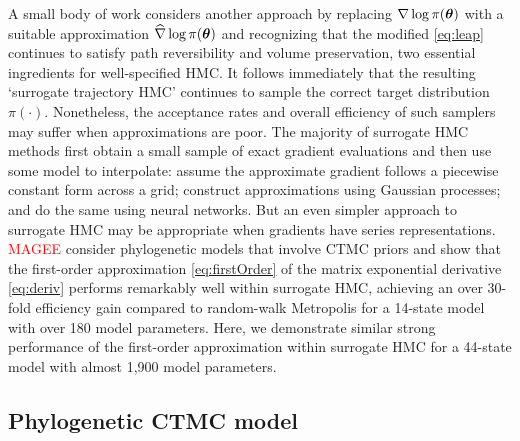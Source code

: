 \documentclass[12pt]{article} %
\begin{document}
A small body of work considers another approach by replacing $\nabla \log \pi (\boldsymbol{\theta})$ with a suitable approximation $\widehat{\nabla} \log \pi (\boldsymbol{\theta})$ and recognizing that the modified \eqref{eq:leap} continues to satisfy path reversibility and volume preservation, two essential ingredients for well-specified HMC. It follows immediately that the resulting `surrogate trajectory HMC' continues to sample the correct target distribution $\pi(\cdot)$.  Nonetheless, the acceptance rates and overall efficiency of such samplers may suffer when approximations are poor.   The majority of surrogate HMC methods first obtain a small sample of exact gradient evaluations and then use some model to interpolate: \citet{zhang2017precomputing} assume the approximate gradient follows a piecewise constant form across a grid; \citet{rasmussen2003gaussian,lan2016emulation} construct approximations using Gaussian processes; and \citet{zhang2017hamiltonian,li2019neural} do the same using neural networks.  But an even simpler approach to surrogate HMC may be appropriate when gradients have series representations.   \textcolor{red}{MAGEE} consider phylogenetic models that involve CTMC priors and show that the first-order approximation \eqref{eq:firstOrder} of the matrix exponential derivative \eqref{eq:deriv} performs remarkably well within surrogate HMC, achieving an over 30-fold efficiency gain compared to random-walk Metropolis for a 14-state model with over 180 model parameters.  Here, we demonstrate similar strong performance of the first-order approximation within surrogate HMC for a 44-state model with almost 1,900 model parameters.  



\subsection{Phylogenetic CTMC model}
\end{document}
